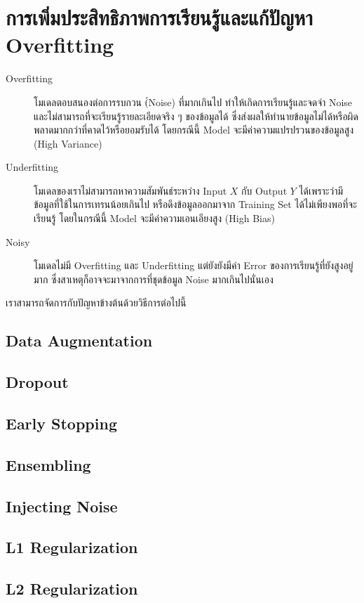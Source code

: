 \section{การเพิ่มประสิทธิภาพการเรียนรู้และแก้ปัญหา Overfitting}

\begin{description} 
    \item[Overfitting] โมเดลตอบสนองต่อการรบกวน (์Noise) ที่มากเกินไป ทำให้เกิดการเรียนรู้และจดจำ Noise และไม่สามารถที่จะเรียนรู้รายละเอียดจริง ๆ ของข้อมูลได้
    ซึ่งส่งผลให้ทำนายข้อมูลไม่ได้หรือผิดพลาดมากกว่าที่คาดไว้หรือยอมรับได้ โดยกรณีนี้ Model จะมีค่าความแปรปรวนของข้อมูลสูง (High Variance)
    
    \item[Underfitting] โมเดลของเราไม่สามารถหาความสัมพันธ์ระหว่าง Input $X$ กับ Output $Y$ ได้เพราะว่ามีข้อมูลที่ใช้ในการเทรนน้อยเกินไป
    หรือดึงข้อมูลออกมาจาก Training Set ได้ไม่เพียงพอที่จะเรียนรู้ โดยในกรณีนี้ Model จะมีค่าความเอนเอียงสูง (High Bias)

    \item[Noisy] โมเดลไม่มี Overfitting และ Underfitting แต่ยังยังมีค่า Error ของการเรียนรู้ที่ยังสูงอยู่มาก ซึ่งสาเหตุก็อาจจะมาจากการที่ชุดข้อมูล Noise มากเกินไปนั่นเอง
\end{description}

เราสามารถจัดการกับปัญหาข้างต้นด้วยวิธีการต่อไปนี้

\subsection{Data Augmentation}

\subsection{Dropout}

\subsection{Early Stopping}

\subsection{Ensembling}

\subsection{Injecting Noise}

\subsection{L1 Regularization}

\subsection{L2 Regularization}
